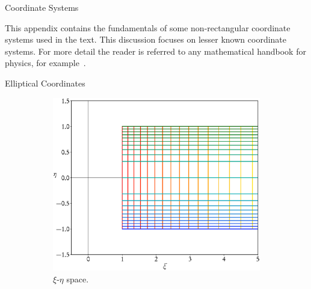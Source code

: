 \documentclass[a5paper, 9 pt]{extreport}
\begin{document}
\begin{appendices}

   \begin{chapter}{Coordinate Systems \label{chap:coords}}

      This appendix contains the fundamentals of some non-rectangular coordinate systems used in the
      text. This discussion focuses on lesser known coordinate systems. For more detail the reader
      is referred to any mathematical handbook for physics, for example~\cite{coord1, coord2}.

      \begin{section}{Elliptical Coordinates \label{sec:elliptic}}

         \begin{figure}[t]
            \centering
            \begin{subfigure}{.5\textwidth}
               \centering
               \includegraphics[width=\linewidth]{./images/appendix/xieta.eps}
               \caption{$\xi$-$\eta$ space. \label{fig:xieta}}
            \end{subfigure}%
            \begin{subfigure}{.5\textwidth}
               \centering

\end{subfigure}
\end{figure}
\end{section}
\end{chapter}
\end{appendices}
\end{document}
